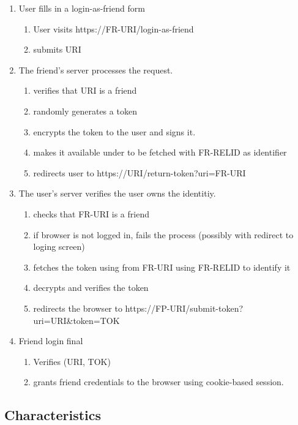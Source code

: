 \documentclass[letterpaper,11pt,oneside]{article}
\begin{document}
\begin{enumerate}
\item User fills in a login-as-friend form
	\begin{enumerate}
	\item User visits https://FR-URI/login-as-friend
	\item submits URI
	\end{enumerate}

\item The friend's server processes the request.
	\begin{enumerate}
	\item verifies that URI is a friend
	\item randomly generates a token
	\item encrypts the token to the user and signs it.
	\item makes it available under to be fetched with FR-RELID as identifier
	\item redirects user to https://URI/return-token?uri=FR-URI
	\end{enumerate}

\item  The user's server verifies the user owns the identitiy.
	\begin{enumerate}
	\item checks that FR-URI is a friend
	\item if browser is not logged in, fails the process (possibly with redirect to loging screen)
	\item fetches the token using from FR-URI using FR-RELID to identify it
	\item decrypts and verifies the token
	\item redirects the browser to https://FP-URI/submit-token?uri=URI\&token=TOK
	\end{enumerate}

\item Friend login final
	\begin{enumerate}
	\item Verifies (URI, TOK)
	\item grants friend credentials to the browser using cookie-based session.
	\end{enumerate}
\end{enumerate}

\subsection{Characteristics}
\end{document}
